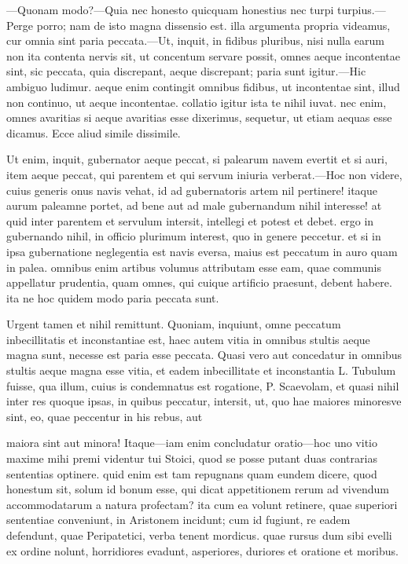  —Quonam modo?—Quia nec honesto quicquam honestius nec turpi turpius.—Perge porro; nam de isto magna dissensio est. illa argumenta propria videamus, cur omnia sint paria peccata.—Ut, inquit, in fidibus pluribus, nisi nulla earum non ita contenta nervis sit, ut concentum servare possit, omnes aeque incontentae sint, sic peccata, quia discrepant, aeque discrepant; paria sunt igitur.—Hic ambiguo ludimur. aeque enim contingit omnibus fidibus, ut incontentae sint, illud non continuo, ut aeque incontentae. collatio igitur ista te nihil iuvat. nec enim, omnes avaritias si aeque avaritias esse dixerimus, sequetur, ut etiam aequas esse dicamus. Ecce aliud simile dissimile.

 Ut enim, inquit, gubernator aeque peccat, si palearum navem evertit et si auri, item aeque peccat, qui parentem et qui servum iniuria verberat.—Hoc non videre, cuius generis onus navis vehat, id ad gubernatoris artem nil pertinere! itaque aurum paleamne portet, ad bene aut ad male gubernandum nihil interesse! at quid inter parentem et servulum intersit, intellegi et potest et debet. ergo in gubernando nihil, in officio plurimum interest, quo in genere peccetur. et si in ipsa gubernatione neglegentia est navis eversa, maius est peccatum in auro quam in palea. omnibus enim artibus volumus attributam esse eam, quae communis appellatur prudentia, quam omnes, qui cuique artificio praesunt, debent habere. ita ne hoc quidem modo paria peccata sunt.

 Urgent tamen et nihil remittunt. Quoniam, inquiunt, omne peccatum inbecillitatis et inconstantiae est, haec autem vitia in omnibus stultis aeque magna sunt, necesse est paria esse peccata. Quasi vero aut concedatur in omnibus stultis aeque magna esse vitia, et eadem inbecillitate et inconstantia L. Tubulum fuisse, qua illum, cuius is condemnatus est rogatione, P. Scaevolam, et quasi nihil inter res quoque ipsas, in quibus peccatur, intersit, ut, quo hae maiores minoresve sint, eo, quae peccentur in his rebus, aut

 maiora sint aut minora! Itaque—iam enim concludatur oratio—hoc uno vitio maxime mihi premi videntur tui Stoici, quod se posse putant duas contrarias sententias optinere. quid enim est tam repugnans quam eundem dicere, quod honestum sit, solum id bonum esse, qui dicat appetitionem rerum ad vivendum accommodatarum a natura profectam? ita cum ea volunt retinere, quae superiori sententiae conveniunt, in Aristonem incidunt; cum id fugiunt, re eadem defendunt, quae Peripatetici, verba tenent mordicus. quae rursus dum sibi evelli ex ordine nolunt, horridiores evadunt, asperiores, duriores et oratione et moribus.

